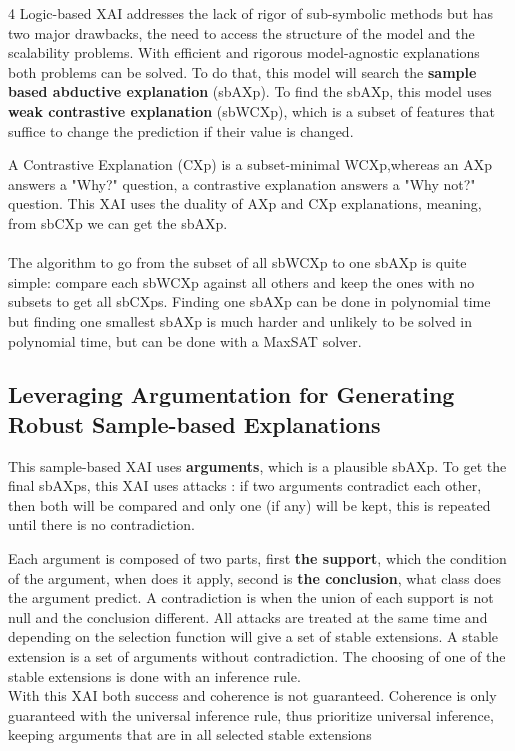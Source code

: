 \documentclass[a0,landscape]{a0poster}
\begin{document}
\begin{multicols}{4}
Logic-based XAI addresses the lack of rigor of sub-symbolic methods but has two major drawbacks, the need to 
access the structure of the model and the scalability problems. With efficient and rigorous model-agnostic 
explanations both problems can be solved. To do that, this model will search  the \textbf{sample based abductive explanation} (sbAXp).
To find the sbAXp, this model uses \textbf{weak contrastive explanation} (sbWCXp), which is a subset of features that suffice to change the prediction if their value is changed.

A Contrastive Explanation (CXp) is a subset-minimal WCXp,whereas an AXp answers a "Why?" question, a contrastive 
explanation answers a "Why not?" question. This XAI uses the duality of AXp and CXp explanations, meaning, from 
sbCXp we can get the sbAXp.\\\\
The algorithm to go from the subset of all sbWCXp to one sbAXp is quite simple: compare each sbWCXp against 
all others and keep the ones with no subsets to get all sbCXps. Finding one sbAXp can be done in polynomial time but 
finding one smallest sbAXp is much harder and unlikely to be solved in polynomial time, but can be done with a MaxSAT solver.

\subsection*{Leveraging Argumentation for Generating Robust Sample-based Explanations}

This sample-based XAI uses \textbf{arguments}, which is a plausible sbAXp. To get the final sbAXps, this XAI uses attacks : if two arguments contradict each other, then both will be compared and only one (if any) will be kept, this is repeated until there is no contradiction. 

Each argument is composed of two parts, first \textbf{the support}, which the condition of the argument, when does it apply, second is \textbf{the conclusion}, what class does the argument predict.
A contradiction is when the union of each support is not null and the conclusion different. All attacks are treated at the same time and depending on the selection function will give a set of stable extensions. A stable extension is a set of arguments without contradiction. The choosing of one of the stable extensions is done with an inference rule.\\

With this XAI both success and coherence is not guaranteed. Coherence is only guaranteed with the universal inference rule, thus prioritize universal inference, keeping arguments that are in all selected stable extensions


\end{multicols}
\end{document}
